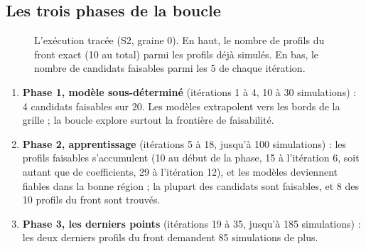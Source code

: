 \subsection{Les trois phases de la boucle}
\begin{figure}[htbp]
\centering

\caption{L'exécution tracée (S2, graine 0). En haut, le nombre de profils du front exact (10 au total) parmi les profils déjà simulés. En bas, le nombre de candidats faisables parmi les 5 de chaque itération.}\label{fig:boucle-trace}
\end{figure}
\begin{enumerate}
\item \textbf{Phase 1, modèle sous-déterminé} (itérations 1 à 4, 10 à 30 simulations) : 4 candidats faisables sur 20. Les modèles extrapolent vers les bords de la grille ; la boucle explore surtout la frontière de faisabilité.
\item \textbf{Phase 2, apprentissage} (itérations 5 à 18, jusqu'à 100 simulations) : les profils faisables s'accumulent (10 au début de la phase, 15 à l'itération 6, soit autant que de coefficients, 29 à l'itération 12), et les modèles deviennent fiables dans la bonne région ; la plupart des candidats sont faisables, et 8 des 10 profils du front sont trouvés.
\item \textbf{Phase 3, les derniers points} (itérations 19 à 35, jusqu'à 185 simulations) : les deux derniers profils du front demandent 85 simulations de plus.
\end{enumerate}

